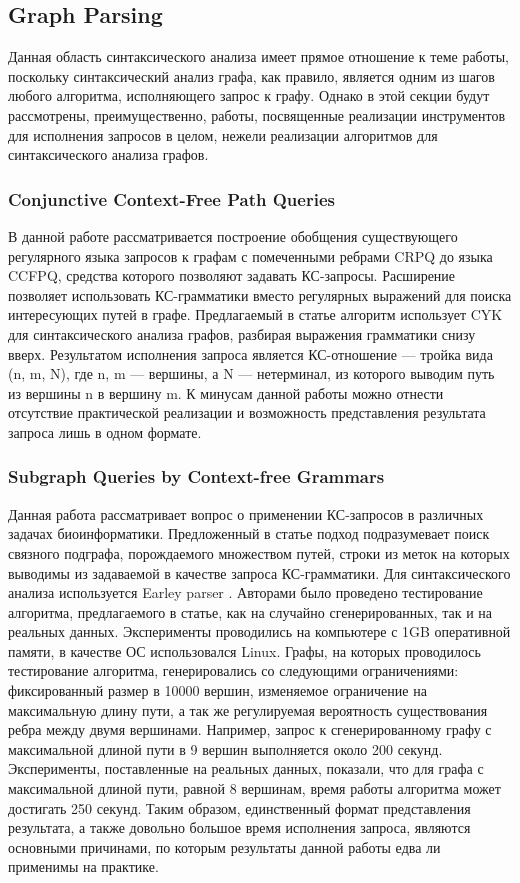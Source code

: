 \documentclass[14pt]{matmex-diploma-custom}
\begin{document}
	\subsection{Graph Parsing}
	Данная область синтаксического анализа имеет прямое отношение к теме работы, поскольку синтаксический анализ графа, как правило, является одним из шагов любого алгоритма, исполняющего запрос к графу. Однако в этой секции будут рассмотрены, преимущественно, работы, посвященные реализации инструментов для исполнения запросов в целом, нежели реализации алгоритмов для синтаксического анализа графов.
		\subsubsection*{Conjunctive Context-Free Path Queries}
		В данной работе рассматривается построение обобщения существующего регулярного языка запросов к графам с помеченными ребрами CRPQ до языка CCFPQ, средства которого позволяют задавать КС-запросы. Расширение позволяет использовать КС-грамматики вместо регулярных выражений для поиска интересующих путей в графе. Предлагаемый в статье алгоритм использует CYK для синтаксического анализа графов, разбирая выражения грамматики снизу вверх. Результатом исполнения запроса является КС-отношение --- тройка вида (n, m, N), где n, m --- вершины, а N --- нетерминал, из которого выводим путь из вершины n в вершину m. К минусам данной работы можно отнести отсутствие практической реализации и возможность представления результата запроса лишь в одном формате.
		\subsubsection*{Subgraph Queries by Context-free Grammars}
		Данная работа рассматривает вопрос о применении КС-запросов в различных задачах биоинформатики. Предложенный в статье подход подразумевает поиск связного подграфа, порождаемого множеством путей, строки из меток на которых выводимы из задаваемой в качестве запроса КС-грамматики. Для синтаксического анализа используется Earley parser \cite{hale2001probabilistic}. Авторами было проведено тестирование алгоритма, предлагаемого в статье, как на случайно сгенерированных, так и на реальных данных. Эксперименты проводились на компьютере с 1GB оперативной памяти, в качестве ОС использовался Linux. Графы, на которых проводилось тестирование алгоритма, генерировались со следующими ограничениями: фиксированный размер в 10000 вершин, изменяемое ограничение на максимальную длину пути, а так же регулируемая вероятность существования ребра между двумя вершинами. Например, запрос к сгенерированному графу с максимальной длиной пути в 9 вершин выполняется около 200 секунд. Эксперименты, поставленные на реальных данных, показали, что для графа с максимальной длиной пути, равной 8 вершинам, время работы алгоритма может достигать 250 секунд. Таким образом, единственный формат представления результата, а также довольно большое время исполнения запроса, являются основными причинами, по которым результаты данной работы едва ли применимы на практике. 
\end{document}
